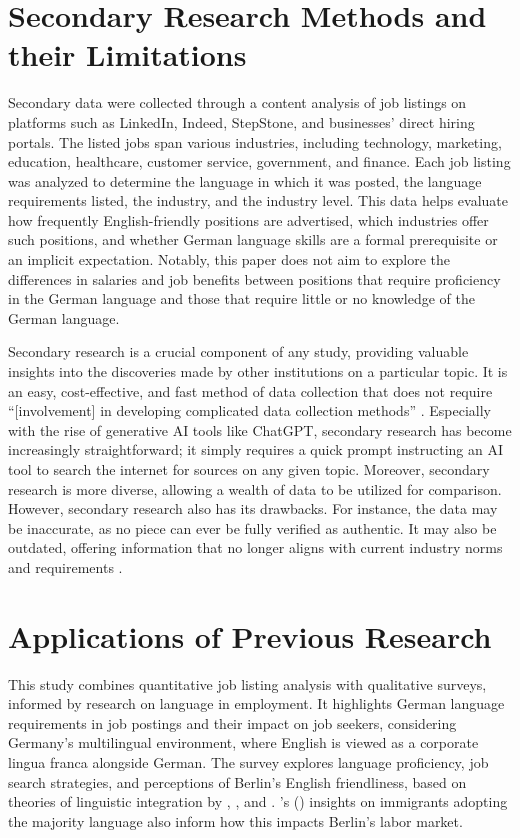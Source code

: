 \section{Secondary Research Methods and their Limitations}
Secondary data were collected through a content analysis of job listings on platforms such as LinkedIn, Indeed, StepStone, and businesses’ direct hiring portals. The listed jobs span various industries, including technology, marketing, education, healthcare, customer service, government, and finance. Each job listing was analyzed to determine the language in which it was posted, the language requirements listed, the industry, and the industry level. This data helps evaluate how frequently English-friendly positions are advertised, which industries offer such positions, and whether German language skills are a formal prerequisite or an implicit expectation. Notably, this paper does not aim to explore the differences in salaries and job benefits between positions that require proficiency in the German language and those that require little or no knowledge of the German language.

Secondary research is a crucial component of any study, providing valuable insights into the discoveries made by other institutions on a particular topic. It is an easy, cost-effective, and fast method of data collection that does not require “[involvement] in developing complicated data collection methods” \citep{Nasrudin25}. Especially with the rise of generative AI tools like ChatGPT, secondary research has become increasingly straightforward; it simply requires a quick prompt instructing an AI tool to search the internet for sources on any given topic. Moreover, secondary research is more diverse, allowing a wealth of data to be utilized for comparison. However, secondary research also has its drawbacks. For instance, the data may be inaccurate, as no piece can ever be fully verified as authentic. It may also be outdated, offering information that no longer aligns with current industry norms and requirements \citep{Nasrudin25}.

\section{Applications of Previous Research}
This study combines quantitative job listing analysis with qualitative surveys, informed by research on language in employment. It highlights German language requirements in job postings and their impact on job seekers, considering Germany's multilingual environment, where English is viewed as a corporate lingua franca alongside German. The survey explores language proficiency, job search strategies, and perceptions of Berlin's English friendliness, based on theories of linguistic integration by \citet{Shohamy06}, \citet{LinguaFranca}, and \citet{Neeley2012}. \citeauthor{gogolin02}'s (\citeyear{gogolin02}) insights on immigrants adopting the majority language also inform how this impacts Berlin's labor market. \par